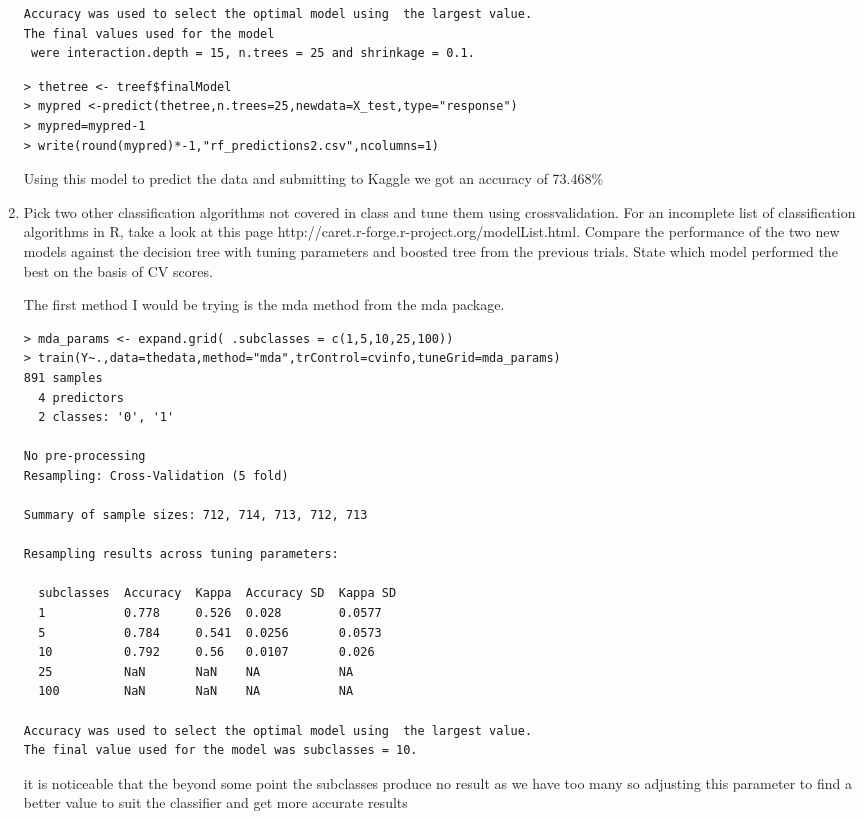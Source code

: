 \documentclass[fontsize=10pt]{scrartcl}
\begin{document}
\begin{enumerate}
\begin{verbatim}
Accuracy was used to select the optimal model using  the largest value.
The final values used for the model
 were interaction.depth = 15, n.trees = 25 and shrinkage = 0.1. 
\end{verbatim}

\begin{verbatim}
> thetree <- treef$finalModel
> mypred <-predict(thetree,n.trees=25,newdata=X_test,type="response")
> mypred=mypred-1
> write(round(mypred)*-1,"rf_predictions2.csv",ncolumns=1)
\end{verbatim}
		Using this model to predict the data and submitting to Kaggle we got an accuracy of 73.468\%


		\item
		Pick two other classiﬁcation algorithms not covered in class and tune them using crossvalidation. For an incomplete list of classiﬁcation algorithms in R, take a look at this page http://caret.r-forge.r-project.org/modelList.html. Compare the performance of the two new models against the decision tree with tuning parameters and boosted tree from the previous trials. State which model performed the best on the basis of CV scores.

		The first method I would be trying is the mda method from the mda package.

\begin{verbatim}
> mda_params <- expand.grid( .subclasses = c(1,5,10,25,100))
> train(Y~.,data=thedata,method="mda",trControl=cvinfo,tuneGrid=mda_params)
891 samples
  4 predictors
  2 classes: '0', '1' 

No pre-processing
Resampling: Cross-Validation (5 fold) 

Summary of sample sizes: 712, 714, 713, 712, 713 

Resampling results across tuning parameters:

  subclasses  Accuracy  Kappa  Accuracy SD  Kappa SD
  1           0.778     0.526  0.028        0.0577  
  5           0.784     0.541  0.0256       0.0573  
  10          0.792     0.56   0.0107       0.026   
  25          NaN       NaN    NA           NA      
  100         NaN       NaN    NA           NA      

Accuracy was used to select the optimal model using  the largest value.
The final value used for the model was subclasses = 10. 
\end{verbatim}
			it is noticeable that the beyond some point the subclasses produce no result as we have too many so adjusting this parameter to find a better value to suit the classifier and get more accurate results


\end{enumerate}
\end{document}
